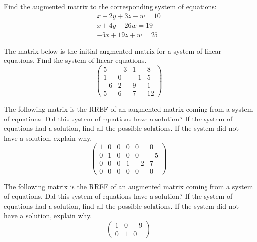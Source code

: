 \documentclass[11pt,letterpaper]{article}
\begin{document}

 Find the augmented matrix to the corresponding system of equations:
	\[
	\begin{gathered}
	x - 2y + 3z - w= 10 \\
	x + 4y - 26w= 19 \\
	-6x + 19z + w= 25
	\end{gathered}
	\]



\newpage



 The matrix below is the initial augmented matrix for a system of linear equations. Find the system of linear equations. 
	\[
	\begin{pmatrix}
	5 & -3 & 1 & 8 \\
	1 & 0 & -1 & 5 \\
	-6 & 2 & 9 & 1 \\
	5 & 6 & 7 & 12
	\end{pmatrix}
	\]



\newpage



 The following matrix is the RREF of an augmented matrix coming from a system of equations. Did this system of equations have a solution? If the system of equations had a solution, find all the possible solutions. If the system did not have a solution, explain why. 
	\[
	\begin{pmatrix}
	1 & 0 & 0 & 0 & 0 & 0 \\
	0 & 1 & 0 & 0 & 0 & -5 \\
	0 & 0 & 0 & 1 & -2 & 7 \\
	0 & 0 & 0 & 0 & 0 & 0 
	\end{pmatrix}
	\]



\newpage



 The following matrix is the RREF of an augmented matrix coming from a system of equations. Did this system of equations have a solution? If the system of equations had a solution, find all the possible solutions. If the system did not have a solution, explain why. 
	\[
	\begin{pmatrix}
	1 & 0 & -9 \\
	0 & 1 & 0 
	\end{pmatrix}
	\]
\end{document}
